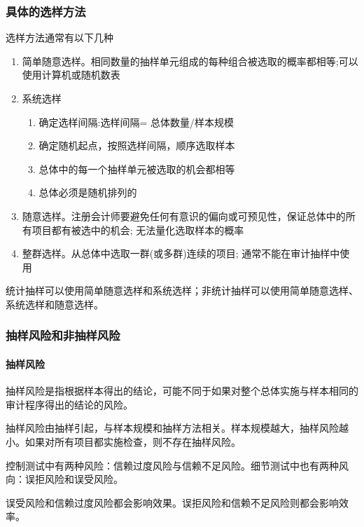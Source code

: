 \documentclass[UTF8,12pt]{ctexart}
\numberwithin{equation}{section} %
\numberwithin{figure}{section}
\numberwithin{table}{section}
\begin{document}
	\subsubsection{具体的选样方法}
	选样方法通常有以下几种
	\begin{enumerate}
		\item 简单随意选样。相同数量的抽样单元组成的每种组合被选取的概率都相等;可以使用计算机或随机数表
		
		\item 系统选样
		\begin{enumerate}
			\item 确定选样间隔:选样间隔= 总体数量/样本规模
			
			\item 确定随机起点，按照选样间隔，顺序选取样本
			
			\item 总体中的每一个抽样单元被选取的机会都相等
			
			\item 总体必须是随机排列的
		\end{enumerate}
		
		\item 随意选样。注册会计师要避免任何有意识的偏向或可预见性，保证总体中的所有项目都有被选中的机会; 无法量化选取样本的概率
		
		\item 整群选样。从总体中选取一群(或多群)连续的项目; 通常不能在审计抽样中使用
	\end{enumerate}
	
	统计抽样可以使用简单随意选样和系统选样；非统计抽样可以使用简单随意选样、系统选样和随意选样。
	
	\subsubsection{抽样风险和非抽样风险}
	\paragraph{抽样风险}
	抽样风险是指根据样本得出的结论，可能不同于如果对整个总体实施与样本相同的审计程序得出的结论的风险。
	
	抽样风险由抽样引起，与样本规模和抽样方法相关。样本规模越大，抽样风险越小。如果对所有项目都实施检查，则不存在抽样风险。
	
	控制测试中有两种风险：信赖过度风险与信赖不足风险。细节测试中也有两种风向：误拒风险和误受风险。
	
	误受风险和信赖过度风险都会影响效果。误拒风险和信赖不足风险则都会影响效率。
	
\end{document}
